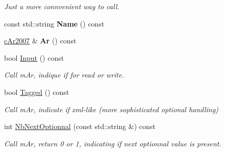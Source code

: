 \begin{DoxyCompactItemize}
\begin{DoxyCompactList}\small\item\em Just a more connvenient way to call. \end{DoxyCompactList}\item 
const std\+::string {\bfseries Name} () const \hypertarget{classMMVII_1_1cAuxAr2007_a0739989138c903abadb72dd68d364179}{}\label{classMMVII_1_1cAuxAr2007_a0739989138c903abadb72dd68d364179}

\item 
\hyperlink{classMMVII_1_1cAr2007}{c\+Ar2007} \& {\bfseries Ar} () const \hypertarget{classMMVII_1_1cAuxAr2007_a417e50567eed899df21124cc2d5353f1}{}\label{classMMVII_1_1cAuxAr2007_a417e50567eed899df21124cc2d5353f1}

\item 
bool \hyperlink{classMMVII_1_1cAuxAr2007_a11054fa3ddcbdc2e65f2262097d33f88}{Input} () const \hypertarget{classMMVII_1_1cAuxAr2007_a11054fa3ddcbdc2e65f2262097d33f88}{}\label{classMMVII_1_1cAuxAr2007_a11054fa3ddcbdc2e65f2262097d33f88}

\begin{DoxyCompactList}\small\item\em Call m\+Ar, indique if for read or write. \end{DoxyCompactList}\item 
bool \hyperlink{classMMVII_1_1cAuxAr2007_a5ed12040a355805a618eed63ba8783ad}{Tagged} () const \hypertarget{classMMVII_1_1cAuxAr2007_a5ed12040a355805a618eed63ba8783ad}{}\label{classMMVII_1_1cAuxAr2007_a5ed12040a355805a618eed63ba8783ad}

\begin{DoxyCompactList}\small\item\em Call m\+Ar, indicate if xml-\/like (more sophisticated optional handling) \end{DoxyCompactList}\item 
int \hyperlink{classMMVII_1_1cAuxAr2007_a40c9460c978b8dddd62a7a535f37e9b5}{Nb\+Next\+Optionnal} (const std\+::string \&) const \hypertarget{classMMVII_1_1cAuxAr2007_a40c9460c978b8dddd62a7a535f37e9b5}{}\label{classMMVII_1_1cAuxAr2007_a40c9460c978b8dddd62a7a535f37e9b5}

\begin{DoxyCompactList}\small\item\em Call m\+Ar, return 0 or 1, indicating if next optionnal value is present. \end{DoxyCompactList}\end{DoxyCompactItemize}
